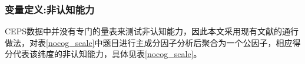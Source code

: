 \documentclass{beamer}
\begin{document}
\begin{frame}
	\frametitle{变量定义:非认知能力}
\begin{table}[!htbp]
\caption{非认知能力的度量}
\label{nocog_scale}
\end{table}
\par CEPS数据中并没有专门的量表来测试非认知能力，因此本文采用现有文献的通行做法\citep{huang_2017,le_2017,li_2015,min_2019,li_2020}，对表\ref{nocog_scale}中题目进行主成分因子分析后聚合为一个公因子，相应得分代表该纬度的非认知能力，具体见表\ref{nocog_scale}。
\end{frame}
\end{document}
